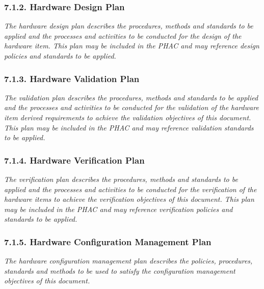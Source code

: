 \documentclass[
]{article}
\begin{document}
\hypertarget{hardware-design-plan}{%
\subsubsection{7.1.2. Hardware Design Plan}\label{hardware-design-plan}}

\emph{The hardware design plan describes the procedures, methods and
standards to be applied and the processes and activities to be conducted
for the design of the hardware item. This plan may be included in the
PHAC and may reference design policies and standards to be applied.}

\hypertarget{hardware-validation-plan}{%
\subsubsection{7.1.3. Hardware Validation
Plan}\label{hardware-validation-plan}}

\emph{The validation plan describes the procedures, methods and
standards to be applied and the processes and activities to be conducted
for the validation of the hardware item derived requirements to achieve
the validation objectives of this document. This plan may be included in
the PHAC and may reference validation standards to be applied.}

\hypertarget{hardware-verification-plan}{%
\subsubsection{7.1.4. Hardware Verification
Plan}\label{hardware-verification-plan}}

\emph{The verification plan describes the procedures, methods and
standards to be applied and the processes and activities to be conducted
for the verification of the hardware items to achieve the verification
objectives of this document. This plan may be included in the PHAC and
may reference verification policies and standards to be applied.}

\hypertarget{hardware-configuration-management-plan}{%
\subsubsection{7.1.5. Hardware Configuration Management
Plan}\label{hardware-configuration-management-plan}}

\emph{The hardware configuration management plan describes the policies,
procedures, standards and methods to be used to satisfy the
configuration management objectives of this document.}
\end{document}
